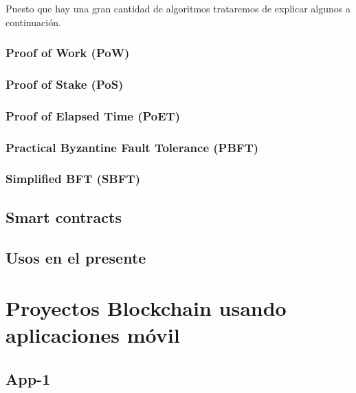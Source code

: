 Puesto que hay una gran cantidad de algoritmos trataremos de explicar algunos a continuación.\cite{algoConsenso}

\subsubsection{Proof of Work (PoW)}
\subsubsection{Proof of Stake (PoS)}
\subsubsection{Proof of Elapsed Time (PoET)}
\subsubsection{Practical Byzantine Fault Tolerance (PBFT)}
\subsubsection{Simplified BFT (SBFT)}


\subsection{Smart contracts}


\subsection{Usos en el presente}


\section{Proyectos Blockchain usando aplicaciones móvil}


\subsection{App-1}


